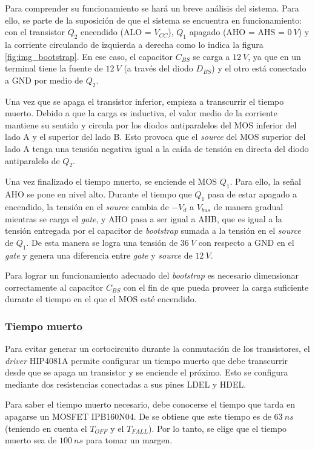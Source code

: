 Para comprender su funcionamiento se hará un breve análisis del sistema. Para ello, se parte de la suposición de que el sistema se encuentra en funcionamiento: con el transistor $Q_2$ encendido (ALO = $V_{CC}$), $Q_1$ apagado (AHO = AHS = $0\:V$) y la corriente circulando de izquierda a derecha como lo indica la figura \ref{fig:img_bootstrap}. En ese caso, el capacitor $C_{BS}$ se carga a $12\:V$, ya que en un terminal tiene la fuente de $12\:V$ (a través del diodo $D_{BS}$) y el otro está conectado a GND por medio de $Q_2$.

Una vez que se apaga el transistor inferior, empieza a transcurrir el tiempo muerto. Debido a que la carga es inductiva, el valor medio de la corriente mantiene su sentido y circula por los diodos antiparalelos del MOS inferior del lado A y el superior del lado B. Esto provoca que el \textsl{source} del MOS superior del lado A tenga una tensión negativa igual a la caída de tensión en directa del diodo antiparalelo de $Q_2$. 

Una vez finalizado el tiempo muerto, se enciende el MOS $Q_1$. Para ello, la señal AHO se pone en nivel alto. Durante el tiempo que $Q_1$ pasa de estar apagado a encendido, la tensión en el \textsl{source} cambia de $-V_d$ a $V_{bus}$ de manera gradual mientras se carga el \textsl{gate}, y AHO pasa a ser igual a AHB, que es igual a la tensión entregada por el capacitor de \textsl{bootstrap} sumada a la tensión en el \textsl{source} de $Q_1$. De esta manera se logra una tensión de $36\:V$ con respecto a GND en el \textsl{gate} y genera una diferencia entre \textsl{gate} y \textsl{source} de $12\:V$.

Para lograr un funcionamiento adecuado del \textsl{bootstrap} es necesario dimensionar correctamente al capacitor $C_{BS}$ con el fin de que pueda proveer la carga suficiente durante el tiempo en el que el MOS esté encendido.

\subsubsection{Tiempo muerto}

\noindent Para evitar generar un cortocircuito durante la conmutación de los transistores, el \textsl{driver} HIP4081A permite configurar un tiempo muerto que debe transcurrir desde que se apaga un transistor y se enciende el próximo. Esto se configura mediante dos resistencias conectadas a sus pines LDEL y HDEL.

\noindent Para saber el tiempo muerto necesario, debe conocerse el tiempo que tarda en apagarse un MOSFET IPB160N04. De \cite{IPB160N04} se obtiene que este tiempo es de $63\:ns$ (teniendo en cuenta el $T_{OFF}$ y el $T_{FALL}$). Por lo tanto, se elige que el tiempo muerto sea de $100\:ns$ para tomar un margen.

